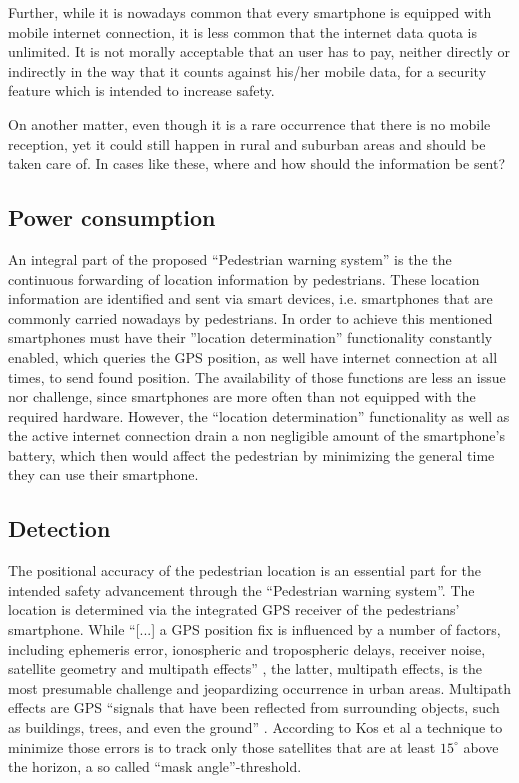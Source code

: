 Further, while it is nowadays common that every smartphone is equipped with mobile internet connection, it is less common that the internet data quota is unlimited. It is not morally acceptable that an user has to pay, neither directly or indirectly in the way that it counts against his/her mobile data, for a security feature which is intended to increase safety.

On another matter, even though it is a rare occurrence that there is no mobile reception, yet it could still happen in rural and suburban areas and should be taken care of. In cases like these, where and how should the information be sent? 

\subsection{Power consumption}
An integral part of the proposed ``Pedestrian warning system'' is the the continuous forwarding of location information by pedestrians. These location information are identified and sent via smart devices, i.e. smartphones that are commonly carried nowadays by pedestrians. In order to achieve this mentioned smartphones must have their ''location determination'' functionality constantly enabled, which queries the GPS position, as well have internet connection at all times, to send found position. The availability of those functions are less an issue nor challenge, since smartphones are more often than not equipped with the required hardware. However, the ``location determination'' functionality as well as the active internet connection %
drain a non negligible amount of the smartphone's battery, which then would affect the pedestrian by minimizing the general time they can use their smartphone.



\subsection{Detection}
The positional accuracy of the pedestrian location is an essential part for the intended safety advancement through the ``Pedestrian warning system''. The location is determined via the integrated GPS receiver of the pedestrians' smartphone. While ``[...] a GPS position fix is influenced by a number of factors, including ephemeris error, ionospheric and tropospheric delays, receiver noise, satellite geometry and multipath effects'' \cite{Zandbergen2011PositionalPhones}, the latter, multipath effects, is the most presumable challenge and jeopardizing occurrence in urban areas.
Multipath effects are GPS ``signals that have been reflected from surrounding objects, such as buildings, trees, and even the ground''\cite{}
. According to Kos et al \cite{}
a technique to minimize those errors is to track only those satellites that are at least $15^{\circ}$ above the horizon, a so called ``mask angle''-threshold.

